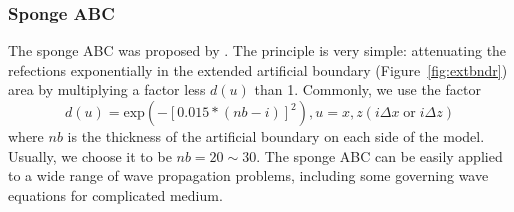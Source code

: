 % 
% 




\subsubsection{Sponge ABC}

The sponge ABC was proposed by \cite{cerjan1985nonreflecting}. The principle is very simple: attenuating the refections exponentially in the extended artificial boundary (Figure~\ref{fig:extbndr}) area by multiplying a factor less $d(u)$ than 1. Commonly, we use the factor
\begin{equation}
d(u)=\mathrm{exp}(-[0.015*(nb-i)]^2), u=x,z (i\Delta x \; \mathrm{or} \; i\Delta z)
\end{equation}
where $nb$ is the thickness of the artificial boundary on each side of the model. Usually, we choose it to be $nb=20 \sim30$.
The sponge ABC can be easily applied to a wide range of wave propagation problems, including some  governing wave equations for complicated medium. 





